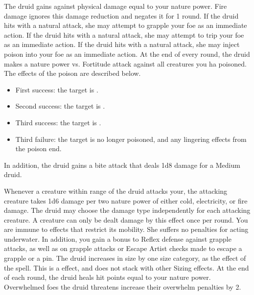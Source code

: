          The druid gains  against physical damage equal to your nature power.
        Fire damage ignores this damage reduction and negates it for 1 round.
        If the druid hits with a natural attack, she may attempt to grapple your foe as an immediate action.
        If the druid hits with a natural attack, she may attempt to trip your foe as an immediate action.
        If the druid hits with a natural attack, she may inject poison into your foe as an immediate action.
        At the end of every round, the druid makes a nature power vs. Fortitude attack against all creatures you ha poisoned.
        The effects of the poison are described below.
        \begin{itemize}
            \item First success: the target is \sickened.
            \item Second success: the target is \staggered.
            \item Third success: the target is \nauseated.
            \item Third failure: the target is no longer poisoned, and any lingering effects from the poison end.
        \end{itemize}
        \par In addition, the druid gains a bite attack that deals 1d8 damage for a Medium druid.

        Whenever a creature within \rngmed range of the druid attacks your, the attacking creature takes 1d6 damage per two nature power of either cold, electricity, or fire damage.
        The druid may choose the damage type independently for each attacking creature.
        A creature can only be dealt damage by this effect once per round.
         You are immune to effects that restrict its mobility. She suffers no penalties for acting underwater. In addition, you gain a  bonus to Reflex defense against grapple attacks, as well as on grapple attacks or Escape Artist checks made to escape a grapple or a pin.
        The druid increases in size by one size category, as the effect of the  spell.
        This is a  effect, and does not stack with other Sizing effects.
        At the end of each round, the druid heals hit points equal to your nature power.
        Overwhelmed foes the druid threatens increase their overwhelm penalties by 2.

